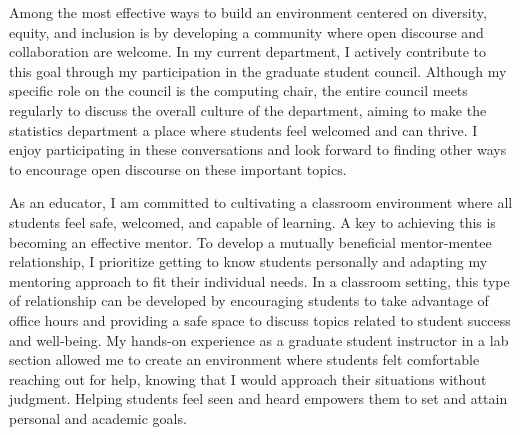 \documentclass[11pt]{article}
\begin{document}
Among the most effective ways to build an environment centered on diversity, equity, and inclusion is by developing a community where open discourse and collaboration are welcome.
In my current department, I actively contribute to this goal through my participation in the graduate student council.
Although my specific role on the council is the computing chair, the entire council meets regularly to discuss the overall culture of the department, aiming to make the statistics department a place where students feel welcomed and can thrive. I enjoy participating in these conversations and look forward to finding other ways to encourage open discourse on these important topics.


As an educator, I am committed to cultivating a classroom environment where all students feel safe, welcomed, and capable of learning.
A key to achieving this is becoming an effective mentor.
To develop a mutually beneficial mentor-mentee relationship, I prioritize getting to know students personally and adapting my mentoring approach to fit their individual needs.
In a classroom setting, this type of relationship can be developed by encouraging students to take advantage of office hours and providing a safe space to discuss topics related to student success and well-being.
My hands-on experience as a graduate student instructor in a lab section allowed me to create an environment where students felt comfortable reaching out for help, knowing that I would approach their situations without judgment.
Helping students feel seen and heard empowers them to set and attain personal and academic goals.
\end{document}
